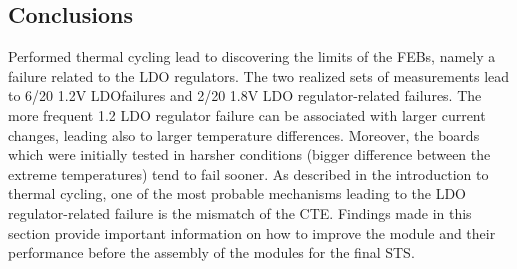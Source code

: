 \subsection{Conclusions}
Performed thermal cycling lead to discovering the limits of the \glspl{FEB}, namely a failure related to the \gls{LDO} regulators. The two realized sets of measurements lead to 6/20 1.2V \gls{LDO}failures and 2/20 1.8V \gls{LDO} regulator-related failures. The more frequent 1.2 \gls{LDO} regulator failure can be associated with larger current changes, leading also to larger temperature differences. Moreover, the boards which were initially tested in harsher conditions (bigger difference between the extreme temperatures) tend to fail sooner. As described in the introduction to thermal cycling, one of the most probable mechanisms leading to the \gls{LDO} regulator-related failure is the mismatch of the \gls{CTE}. Findings made in this section provide important information on how to improve the module and their performance before the assembly of the modules for the final \gls{STS}. 



\newpage